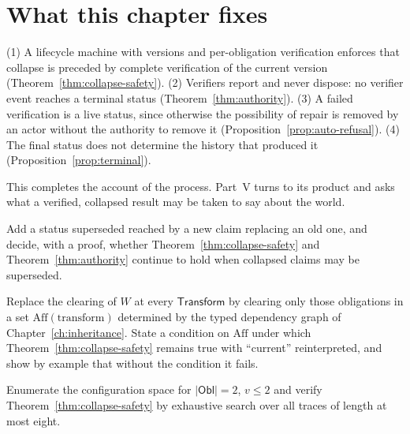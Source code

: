 \section{What this chapter fixes}

\begin{principal}
(1) A lifecycle machine with versions and per-obligation verification enforces that collapse is preceded by complete verification of the current version (Theorem~\ref{thm:collapse-safety}). (2) Verifiers report and never dispose: no verifier event reaches a terminal status (Theorem~\ref{thm:authority}). (3) A failed verification is a live status, since otherwise the possibility of repair is removed by an actor without the authority to remove it (Proposition~\ref{prop:auto-refusal}). (4) The final status does not determine the history that produced it (Proposition~\ref{prop:terminal}).
\end{principal}

This completes the account of the process. Part~V turns to its product and asks what a verified, collapsed result may be taken to say about the world.

\begin{exercise}
Add a status \textsf{superseded} reached by a new claim replacing an old one, and decide, with a proof, whether Theorem~\ref{thm:collapse-safety} and Theorem~\ref{thm:authority} continue to hold when \textsf{collapsed} claims may be superseded.
\end{exercise}

\begin{exercise}
Replace the clearing of $W$ at every $\mathsf{Transform}$ by clearing only those obligations in a set $\mathrm{Aff}(\text{transform})$ determined by the typed dependency graph of Chapter~\ref{ch:inheritance}. State a condition on $\mathrm{Aff}$ under which Theorem~\ref{thm:collapse-safety} remains true with ``current'' reinterpreted, and show by example that without the condition it fails.
\end{exercise}

\begin{exercise}
Enumerate the configuration space for $|\mathsf{Obl}|=2$, $v\le2$ and verify Theorem~\ref{thm:collapse-safety} by exhaustive search over all traces of length at most eight.
\end{exercise}
